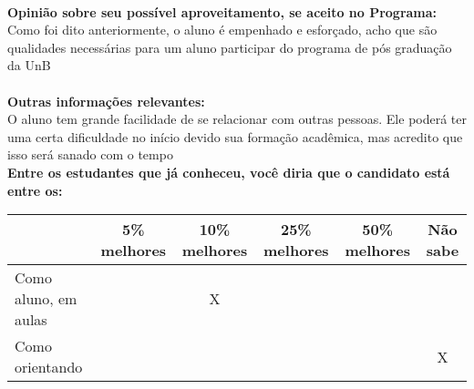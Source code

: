 \documentclass[11pt]{article}
\begin{document}
\\
\textbf{Opinião sobre seu possível aproveitamento, se aceito no Programa:}
\\Como foi dito anteriormente, o aluno é empenhado e esforçado, acho que são qualidades necessárias para um aluno participar do programa de pós graduação da UnB\\ 
\\
\textbf{Outras informações relevantes:} \\O aluno tem grande facilidade de se relacionar com outras pessoas. 
Ele poderá ter uma certa dificuldade no início devido sua formação acadêmica, mas acredito que isso será sanado com o tempo
\\[0.3cm]
\textbf{Entre os estudantes que já conheceu, você diria que o candidato está entre os:}
\\
\begin{tabular}{|l|c|c|c|c|c|}
\hline
 & 5\% melhores & 10\% melhores & 25\% melhores & 50\% melhores & Não sabe \\
\hline
Como aluno, em aulas &  & X &  &  & \\
\hline
Como orientando &  &  &  &  & X\\
\hline
\end{tabular}
\end{document}
